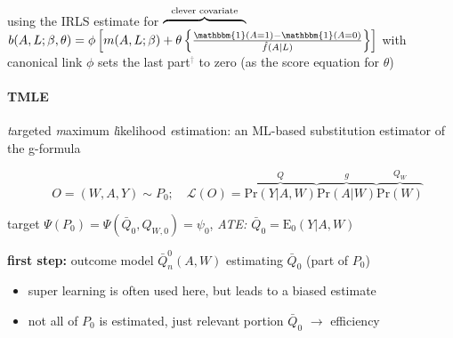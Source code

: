 \documentclass[8pt,twoside]{extarticle}
\begin{document}
\begin{multicols}{2}
\begin{mdframed}[style=MyFrame,nobreak=true, innerleftmargin=2pt, innerrightmargin=2pt]
 using the IRLS estimate for \hspace{2em} $\overbrace{ \hspace{6.7em} }^{\text{clever covariate}}$ \newline
 $b(A,L;\beta,\theta)=\phi\left[m(A,L;\beta) + \theta\left\{\frac{\mathbbm{1}(A{=}1)-\mathbbm{1}(A{=}0)}{\hat{f}(A|L)}\right\}\right]$ with canonical link $\phi$ sets the last part\textcolor{gray}{$^\dagger$} to zero (as the score equation for $\theta$)
\end{mdframed}




\paragraph{TMLE} \citep{van2006targeted, van2011targeted} \textit{t}argeted \textit{m}aximum \textit{l}ikelihood \textit{e}stimation:  an ML-based substitution estimator of the g-formula
\vspace{-2.5em}

$$\hspace{1em} O=(W, A, Y) \sim P_0; \hspace{1em} \mathcal{L}(O) = \overbrace{\mathrm{Pr}(Y|A, W)}^{Q}\overbrace{\mathrm{Pr}(A|W)}^{g}\overbrace{\mathrm{Pr}(W)}^{Q_W}$$

 target $\Psi(P_0) = \Psi(\bar{Q}_0, Q_{W,0}) = \psi_0$, 
\textit{ATE: $\bar{Q}_0 = \mathrm{E}_0(Y|A,W)$} %

 \textbf{first step:} outcome model $\bar{Q}^0_n(A,W)$ estimating $\bar{Q}_0$ (part of $P_0$)
\begin{itemize}[leftmargin=*, itemsep=0em, topsep=0pt, partopsep=0pt,parsep=0pt]
\setlength{\itemsep}{0pt}%
\setlength{\parskip}{0pt}
\item  super learning is often used here, but leads to a biased estimate
\item not all of $P_0$ is estimated, just relevant portion  $\bar{Q}_0$ $\rightarrow$ efficiency 
\end{itemize}


\end{multicols}
\end{document}

